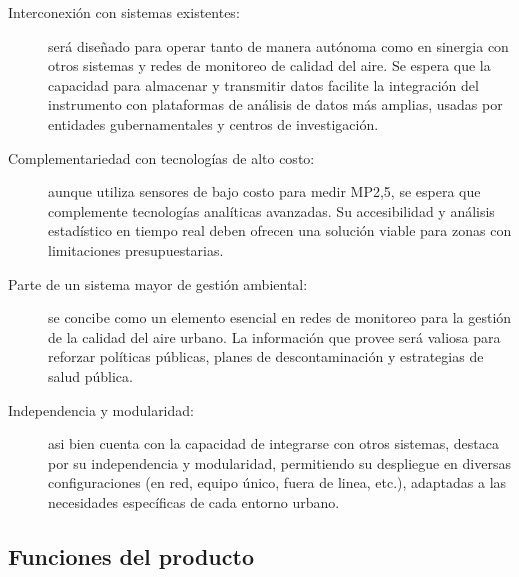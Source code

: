 \documentclass[
11pt, %
codirector, %
]{charter}
\begin{document}
\begin{description}
	\item[Interconexión con sistemas existentes:] será diseñado para operar tanto de manera autónoma como en sinergia con otros sistemas y redes de monitoreo de calidad del aire. Se espera que la capacidad para almacenar y transmitir datos facilite la integración del instrumento con plataformas de análisis de datos más amplias, usadas por entidades gubernamentales y centros de investigación.
	
	\item[Complementariedad con tecnologías de alto costo:] aunque utiliza sensores de bajo costo para medir MP2,5, se espera que complemente tecnologías analíticas avanzadas. Su accesibilidad y análisis estadístico en tiempo real deben ofrecen una solución viable para zonas con limitaciones presupuestarias.

	\item[Parte de un sistema mayor de gestión ambiental:] se concibe como un elemento esencial en redes de monitoreo para la gestión de la calidad del aire urbano. La información que provee será valiosa para reforzar políticas públicas, planes de descontaminación y estrategias de salud pública.

	\item[Independencia y modularidad:] asi bien cuenta con la capacidad de integrarse con otros sistemas, destaca por su independencia y modularidad, permitiendo su despliegue en diversas configuraciones (en red, equipo único, fuera de linea, etc.), adaptadas a las necesidades específicas de cada entorno urbano.



\end{description}


\subsection{Funciones del producto}
\label{sec:orgaf51da6}

%
\end{document}

